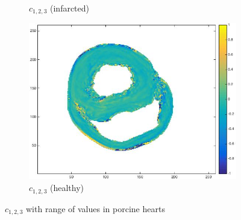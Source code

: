 \begin{figure}[h!]
\begin{subfigure}[h!]{0.3\textwidth}
        \caption{$c_{1,2,3}$ (infarcted)}
        \label{fig:c123infarcted}
    \end{subfigure}
    \hfill
    \begin{subfigure}[h!]{0.3\textwidth}
        \centering
        \includegraphics[width=\textwidth]{figures/pig25_c123_slice_30}
        \caption{$c_{1,2,3}$ (healthy)}
        \label{fig:c123healthy}
    \end{subfigure}
    \caption{$c_{1,2,3}$ with range of values in porcine hearts}
    \label{fig:c123}
\end{figure}

